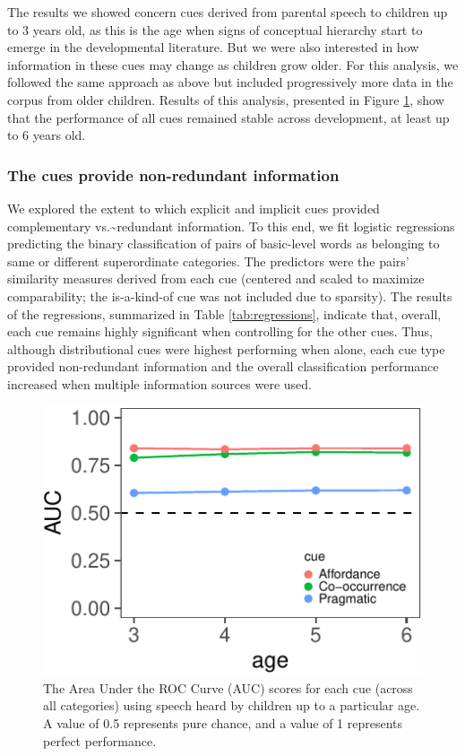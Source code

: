 \documentclass[10pt, letterpaper]{article}
\newenvironment{CodeChunk}{}{}
\begin{document}
The results we showed concern cues derived from parental speech to
children up to 3 years old, as this is the age when signs of conceptual
hierarchy start to emerge in the developmental literature. But we were
also interested in how information in these cues may change as children
grow older. For this analysis, we followed the same approach as above
but included progressively more data in the corpus from older children.
Results of this analysis, presented in Figure \ref{fig:dev}, show that
the performance of all cues remained stable across development, at least
up to 6 years old.

\hypertarget{the-cues-provide-non-redundant-information}{%
\subsubsection{The cues provide non-redundant
information}\label{the-cues-provide-non-redundant-information}}

We explored the extent to which explicit and implicit cues provided
complementary vs.\textasciitilde{}redundant information. To this end, we
fit logistic regressions predicting the binary classification of pairs
of basic-level words as belonging to same or different superordinate
categories. The predictors were the pairs' similarity measures derived
from each cue (centered and scaled to maximize comparability; the
is-a-kind-of cue was not included due to sparsity). The results of the
regressions, summarized in Table \ref{tab:regressions}, indicate that,
overall, each cue remains highly significant when controlling for the
other cues. Thus, although distributional cues were highest performing
when alone, each cue type provided non-redundant information and the
overall classification performance increased when multiple information
sources were used.

\begin{CodeChunk}
\begin{figure}[h]

{\centering \includegraphics{cogsci_files/figure-latex/dev-1} 

}

\caption{\label{fig:dev} The Area Under the ROC Curve (AUC) scores for each cue (across all categories) using speech heard by children up to a particular age. A value of 0.5 represents pure chance, and a value of 1 represents perfect performance.}\label{fig:dev}
\end{figure}
\end{CodeChunk}
\end{document}
